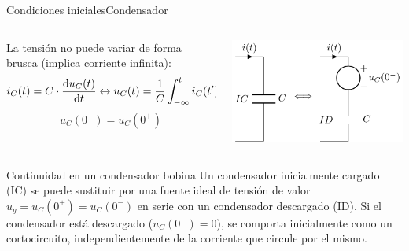 \documentclass[aspectratio=169, xcolor={usenames,svgnames,dvipsnames}]{beamer}
\begin{document}
\begin{frame}{Condiciones iniciales}{Condensador}
\begin{columns}
\begin{column}{0.5\linewidth}
La tensión no puede variar de forma brusca (implica corriente infinita):
\[
i_C(t) = C \cdot \diff{u_C(t)}{t}
\leftrightarrow
u_C(t) = \frac{1}{C} \int^t_{-\infty}i_C(t') \mathrm{d}t'
\]
\[
\boxed{u_C(0^-) = u_C(0^+)}
\]
\end{column}

\begin{column}{0.5\linewidth}
\begin{center}
    \includegraphics[width=0.8\linewidth]{../figs/condiciones_iniciales_C.pdf}
\end{center}
\end{column}
\end{columns}


\begin{block}{Continuidad en un condensador bobina}
Un condensador inicialmente cargado (IC) se puede sustituir por una fuente ideal de tensión de valor $u_g=u_C(0^+)=u_C(0^-)$ en serie con un condensador descargado (ID). Si el condensador está descargado ($u_C(0^-)=0$), se comporta inicialmente como un \alert{cortocircuito}, independientemente de la corriente que circule por el mismo.
\end{block}
\end{frame}
\end{document}
